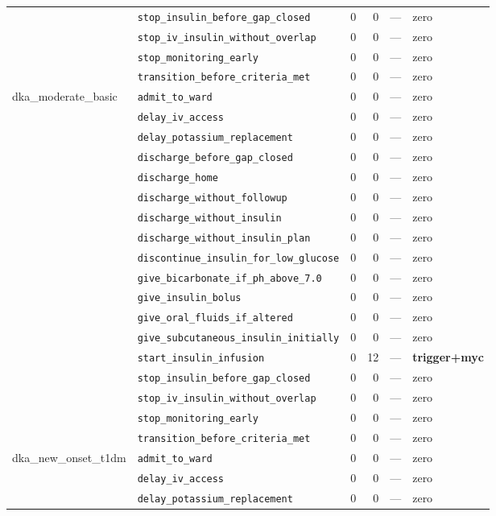 \begin{table}[ht]
\begin{tabular}{llrrrl}
 & \texttt{stop\_insulin\_before\_gap\_closed} & 0 & 0 & — & zero \\
 & \texttt{stop\_iv\_insulin\_without\_overlap} & 0 & 0 & — & zero \\
 & \texttt{stop\_monitoring\_early} & 0 & 0 & — & zero \\
 & \texttt{transition\_before\_criteria\_met} & 0 & 0 & — & zero \\
\midrule
dka\_moderate\_basic & \texttt{admit\_to\_ward} & 0 & 0 & — & zero \\
 & \texttt{delay\_iv\_access} & 0 & 0 & — & zero \\
 & \texttt{delay\_potassium\_replacement} & 0 & 0 & — & zero \\
 & \texttt{discharge\_before\_gap\_closed} & 0 & 0 & — & zero \\
 & \texttt{discharge\_home} & 0 & 0 & — & zero \\
 & \texttt{discharge\_without\_followup} & 0 & 0 & — & zero \\
 & \texttt{discharge\_without\_insulin} & 0 & 0 & — & zero \\
 & \texttt{discharge\_without\_insulin\_plan} & 0 & 0 & — & zero \\
 & \texttt{discontinue\_insulin\_for\_low\_glucose} & 0 & 0 & — & zero \\
 & \texttt{give\_bicarbonate\_if\_ph\_above\_7.0} & 0 & 0 & — & zero \\
 & \texttt{give\_insulin\_bolus} & 0 & 0 & — & zero \\
 & \texttt{give\_oral\_fluids\_if\_altered} & 0 & 0 & — & zero \\
 & \texttt{give\_subcutaneous\_insulin\_initially} & 0 & 0 & — & zero \\
 & \texttt{start\_insulin\_infusion} & 0 & 12 & — & \textbf{trigger+myc} \\
 & \texttt{stop\_insulin\_before\_gap\_closed} & 0 & 0 & — & zero \\
 & \texttt{stop\_iv\_insulin\_without\_overlap} & 0 & 0 & — & zero \\
 & \texttt{stop\_monitoring\_early} & 0 & 0 & — & zero \\
 & \texttt{transition\_before\_criteria\_met} & 0 & 0 & — & zero \\
\midrule
dka\_new\_onset\_t1dm & \texttt{admit\_to\_ward} & 0 & 0 & — & zero \\
 & \texttt{delay\_iv\_access} & 0 & 0 & — & zero \\
 & \texttt{delay\_potassium\_replacement} & 0 & 0 & — & zero \\

\end{tabular}
\end{table}
